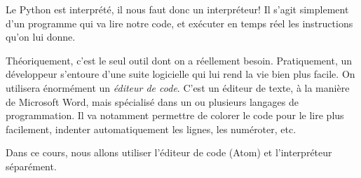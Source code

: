 Le Python est interprété, il nous faut donc un interpréteur! Il s'agit simplement d'un programme qui va lire notre code, et exécuter en temps réel les instructions qu'on lui donne.

Théoriquement, c'est le seul outil dont on a réellement besoin. Pratiquement, un développeur s'entoure d'une suite logicielle qui lui rend la vie bien plus facile. On utilisera énormément un \textit{éditeur de code}. C'est un éditeur de texte, à la manière de Microsoft Word, mais spécialisé dans un ou plusieurs langages de programmation. Il va notamment permettre de colorer le code pour le lire plus facilement, indenter automatiquement les lignes, les numéroter, etc.

Dans ce cours, nous allons utiliser l'éditeur de code (Atom) et l'interpréteur séparément.
